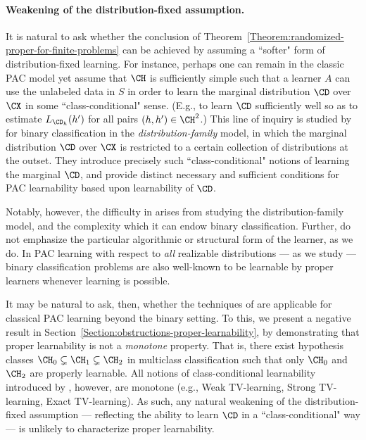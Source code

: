 \documentclass[11pt]{article}
\begin{document}
\paragraph{Weakening of the distribution-fixed assumption.} It is natural to ask whether the conclusion of Theorem~\ref{Theorem:randomized-proper-for-finite-problems} can be achieved by assuming a ``softer" form of distribution-fixed learning. For instance, perhaps one can remain in the classic PAC model yet assume that $\CH$ is sufficiently simple such that a learner $A$ can use the unlabeled data in $S$ in order to learn the marginal distribution $\CD$ over $\CX$ in some ``class-conditional" sense. (E.g., to learn $\CD$ sufficiently well so as to estimate $L_{\CD_{h}}(h')$ for all pairs $(h, h') \in \CH^2$.) This line of inquiry is studied by \citet{hopkins2023pac} for binary classification in the \emph{distribution-family} model, in which the marginal distribution $\CD$ over $\CX$ is restricted to a certain collection of distributions at the outset. They introduce precisely such ``class-conditional" notions of learning the marginal $\CD$, and provide distinct necessary and sufficient conditions for PAC learnability based upon learnability of $\CD$.  

Notably, however, the difficulty in \citet{hopkins2023pac} arises from studying the distribution-family model, and the complexity which it can endow binary classification.  Further, \citet{hopkins2023pac} do not emphasize the particular algorithmic or structural form of the learner, as we do. In PAC learning with respect to \emph{all} realizable distributions --- as we study --- binary classification problems are also well-known to be learnable by proper learners whenever learning is possible. 

It may be natural to ask, then, whether the techniques of \citet{hopkins2023pac} are applicable for classical PAC learning beyond the binary setting. To this, we present a negative result in Section~\ref{Section:obstructions-proper-learnability}, by demonstrating that proper learnability is not a \emph{monotone} property. That is, there exist hypothesis classes $\CH_0 \subsetneq \CH_1 \subsetneq \CH_2$ in multiclass classification such that only $\CH_0$ and $\CH_2$ are properly learnable. All notions of class-conditional learnability introduced by \citet{hopkins2023pac}, however, are monotone (e.g., Weak TV-learning, Strong TV-learning, Exact TV-learning). As such, any natural weakening of the distribution-fixed assumption --- reflecting the ability to learn $\CD$ in a ``class-conditional" way --- is unlikely to characterize proper learnability. 
\end{document}
